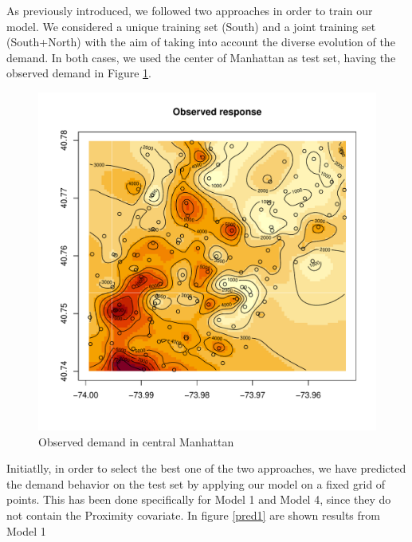 \documentclass[12pt]{article}
\begin{document}
\noindent
As previously introduced, we followed two approaches in order to train our model. We considered a unique training set (South) and a joint training set (South+North) with the aim of taking into account the diverse evolution of the demand.
In both cases, we used the center of Manhattan as test set, having the observed demand in Figure \ref{observed}.\\
\vspace{3 mm}
\begin{figure}[H]
		\centering
		\includegraphics[scale=0.50]{Pictures/Obs_centre_map.pdf}
		\caption{Observed demand in central Manhattan}\label{observed}
\end{figure}

\noindent
Initiatlly, in order to select the best one of the two approaches, we have predicted the demand behavior on the test set by applying our model on a fixed grid of points. This has been done specifically for Model 1 and Model 4, since they do not contain the Proximity covariate. In figure \ref{pred1} are shown results from Model 1 \\
\end{document}
